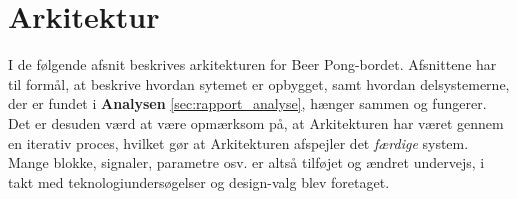 \documentclass[Rapport/Rapport_main.tex]{subfiles}
\begin{document}
\section{Arkitektur}
I de følgende afsnit beskrives arkitekturen for Beer Pong-bordet. Afsnittene har til formål, at beskrive hvordan sytemet er opbygget, samt hvordan delsystemerne, der er fundet i \textbf{Analysen} \ref{sec:rapport_analyse}, hænger sammen og fungerer. Det er desuden værd at være opmærksom på, at Arkitekturen har været gennem en iterativ proces, hvilket gør at Arkitekturen afspejler det \textit{færdige} system. Mange blokke, signaler, parametre osv. er altså tilføjet og ændret undervejs, i takt med teknologiundersøgelser og design-valg blev foretaget.


\newpage

\newpage

\newpage

\newpage

\end{document}
